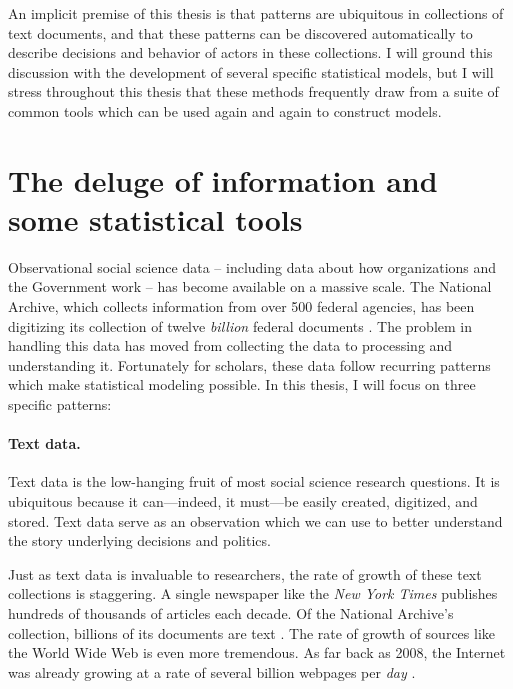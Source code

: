 An implicit premise of this thesis is that patterns are ubiquitous in
collections of text documents, and that these patterns can be
discovered automatically to describe decisions and behavior of actors
in these collections.  I will ground this discussion with the
development of several specific statistical models, but I will stress
throughout this thesis that these methods frequently draw from a suite
of common tools which can be used again and again to construct models.

\section*{The deluge of information and some statistical tools}

Observational social science data -- including data about how
organizations and the Government work -- has become available on a
massive scale. The National Archive, which collects information from
over 500 federal agencies, has been digitizing its collection of
twelve \emph{billion} federal documents \citep{lazer:2009,
  national_archives:2012a,national_archives:2012b}.  The problem in
handling this data has moved from collecting the data to processing
and understanding it.  Fortunately for scholars, these data follow
recurring patterns which make statistical modeling possible. In this
thesis, I will focus on three specific patterns:

\paragraph{Text data.} Text data is the low-hanging fruit of most
social science research questions.  It is ubiquitous because it
can---indeed, it must---be easily created, digitized, and stored. Text
data serve as an observation which we can use to better understand the
story underlying decisions and politics.

Just as text data is invaluable to researchers, the rate of growth of
these text collections is staggering.  A single newspaper like the
\emph{New York Times} publishes hundreds of thousands of articles each
decade.  Of the National Archive's collection, billions of its
documents are text
\citep{national_archives:2012a,national_archives:2012b}.  The rate of
growth of sources like the World Wide Web is even more tremendous.  As
far back as 2008, the Internet was already growing at a rate of
several billion webpages per \emph{day} \citep{googleblog:2008}.

